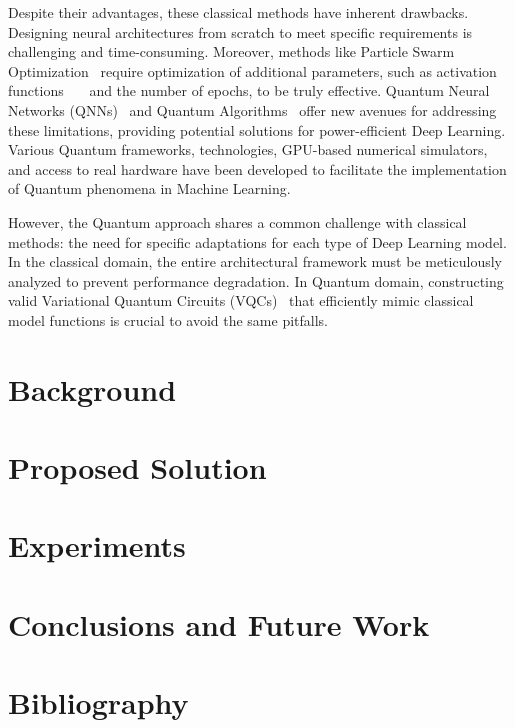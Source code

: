 \documentclass[12pt,a4paper]{report}
\begin{document}
Despite their advantages, these classical methods have inherent drawbacks. Designing neural architectures from scratch to meet specific requirements is challenging and time-consuming. Moreover, methods like Particle Swarm Optimization~\cite{7986470} require optimization of additional parameters, such as activation functions~\cite{han1995influence}~\cite{NIPS2017_a96b65a7}~\cite{xu2020reluplex} and the number of epochs, to be truly effective. Quantum Neural Networks (QNNs)~\cite{abbas2021power} and Quantum Algorithms~\cite{cerezo2021variational} offer new avenues for addressing these limitations, providing potential solutions for power-efficient Deep Learning. Various Quantum frameworks, technologies, GPU-based numerical simulators, and access to real hardware have been developed to facilitate the implementation of Quantum phenomena in Machine Learning.

However, the Quantum approach shares a common challenge with classical methods: the need for specific adaptations for each type of Deep Learning model.
In the classical domain, the entire architectural framework must be meticulously analyzed to prevent performance degradation. In Quantum domain, constructing valid Variational Quantum Circuits (VQCs)~\cite{benedetti2019parameterized} that efficiently mimic classical model functions is crucial to avoid the same pitfalls.
\chapter{Background}\pagestyle{fancy}

\chapter{Proposed Solution}\pagestyle{fancy}

\chapter{Experiments}\pagestyle{fancy}

\chapter{Conclusions and Future Work}\pagestyle{fancy}

\chapter{Bibliography}\pagestyle{fancy}



\begingroup
\def\chapter*#1{}

\endgroup
\end{document}
